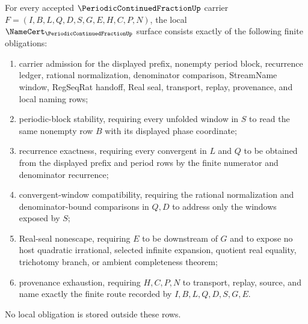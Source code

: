 \begin{theorem}
\label{thm:periodic-continued-fraction-namecert-obligations}
For every accepted $\PeriodicContinuedFractionUp$ carrier $F=(I,B,L,Q,D,S,G,E,H,C,P,N)$, the local $\NameCert_{\PeriodicContinuedFractionUp}$ surface consists exactly of the following finite obligations:
\begin{enumerate}
\item carrier admission for the displayed prefix, nonempty period block, recurrence ledger, rational normalization, denominator comparison, StreamName window, RegSeqRat handoff, Real seal, transport, replay, provenance, and local naming rows;
\item periodic-block stability, requiring every unfolded window in $S$ to read the same nonempty row $B$ with its displayed phase coordinate;
\item recurrence exactness, requiring every convergent in $L$ and $Q$ to be obtained from the displayed prefix and period rows by the finite numerator and denominator recurrence;
\item convergent-window compatibility, requiring the rational normalization and denominator-bound comparisons in $Q,D$ to address only the windows exposed by $S$;
\item Real-seal nonescape, requiring $E$ to be downstream of $G$ and to expose no host quadratic irrational, selected infinite expansion, quotient real equality, trichotomy branch, or ambient completeness theorem;
\item provenance exhaustion, requiring $H,C,P,N$ to transport, replay, source, and name exactly the finite route recorded by $I,B,L,Q,D,S,G,E$.
\end{enumerate}
No local obligation is stored outside these rows.
\end{theorem}
